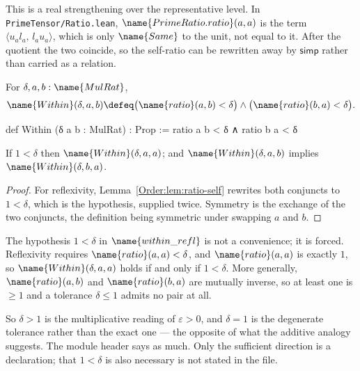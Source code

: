 This is a real strengthening over the representative level.  In
\texttt{PrimeTensor/Ratio.lean}, $\name{PrimeRatio.ratio}(a,a)$ is the term
$\langle u_a l_a,\, l_a u_a \rangle$, which is only $\name{Same}$ to the unit,
not equal to it.  After the quotient the two coincide, so the self-ratio can
be rewritten away by $\mathsf{simp}$ rather than carried as a relation.

\begin{definition}
\label{Order:def:within}
For $\delta, a, b : \name{MulRat}$,
\[
  \name{Within}(\delta, a, b) \defeq
    \bigl(\name{ratio}(a,b) < \delta\bigr) \wedge
    \bigl(\name{ratio}(b,a) < \delta\bigr).
\]
\end{definition}

\begin{leancode}
def Within (δ a b : MulRat) : Prop :=
  ratio a b < δ ∧ ratio b a < δ
\end{leancode}

\begin{lemma}
\label{Order:lem:within}
If $1 < \delta$ then $\name{Within}(\delta, a, a)$; and
$\name{Within}(\delta, a, b)$ implies $\name{Within}(\delta, b, a)$.
\end{lemma}

\begin{proof}
For reflexivity, Lemma~\ref{Order:lem:ratio-self} rewrites both conjuncts to
$1 < \delta$, which is the hypothesis, supplied twice.  Symmetry is the
exchange of the two conjuncts, the definition being symmetric under swapping
$a$ and $b$.
\end{proof}

\begin{designnote}\label{Order:note:delta}
The hypothesis $1 < \delta$ in $\name{within\_refl}$ is not a convenience; it
is forced.  Reflexivity requires $\name{ratio}(a,a) < \delta$, and
$\name{ratio}(a,a)$ is exactly $1$, so $\name{Within}(\delta,a,a)$ holds if and
only if $1 < \delta$.  More generally, $\name{ratio}(a,b)$ and
$\name{ratio}(b,a)$ are mutually inverse, so at least one is $\geq 1$ and a
tolerance $\delta \leq 1$ admits no pair at all.

So $\delta > 1$ is the multiplicative reading of $\varepsilon > 0$, and
$\delta = 1$ is the degenerate tolerance rather than the exact one --- the
opposite of what the additive analogy suggests.  The module header says as
much.  Only the sufficient direction is a declaration; that $1 < \delta$ is
also necessary is not stated in the file.
\end{designnote}

